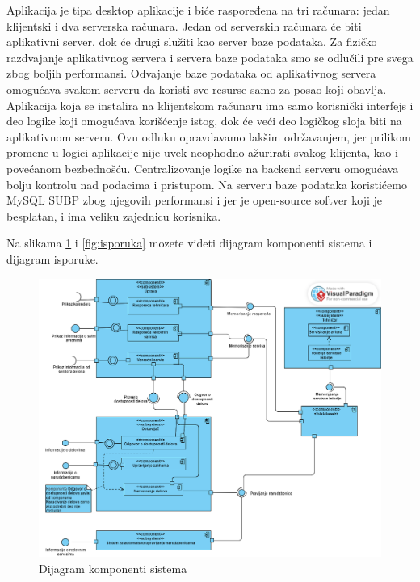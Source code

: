 \documentclass[a4paper]{article}
\begin{document}
Aplikacija je tipa desktop aplikacije i biće raspoređena na tri računara: jedan klijentski i dva serverska računara. Jedan od serverskih računara će biti aplikativni server, dok će drugi služiti kao server baze podataka. Za fizičko razdvajanje aplikativnog servera i servera baze podataka smo se odlučili pre svega zbog boljih performansi. Odvajanje baze podataka od aplikativnog servera omogućava svakom serveru da koristi sve resurse samo za posao koji obavlja. Aplikacija koja se instalira na klijentskom računaru ima samo korisnički interfejs i deo logike koji omogućava korišćenje istog, dok će veći deo logičkog sloja biti na aplikativnom serveru. Ovu odluku opravdavamo lakšim održavanjem, jer prilikom promene u logici aplikacije nije uvek neophodno ažurirati svakog klijenta, kao i povećanom bezbednošću. Centralizovanje logike na backend serveru omogućava bolju kontrolu nad podacima i pristupom. Na serveru baze podataka koristićemo MySQL SUBP zbog njegovih performansi i jer je open-source softver koji je besplatan, i ima veliku zajednicu korisnika.

Na slikama \ref{fig:dijagram_komponenti_sistema} i \ref{fig:isporuka} mozete videti dijagram komponenti sistema i dijagram isporuke. 

\begin{figure}[H]
\begin{center}
\includegraphics[scale=0.6, width = 1.2\textwidth]{Dijagrami/Dijagrami_komponenti_sistema/Dijagram_komponenti_sistema.png}
\end{center}
\caption{Dijagram komponenti sistema}
\label{fig:dijagram_komponenti_sistema}
\end{figure}
\end{document}
